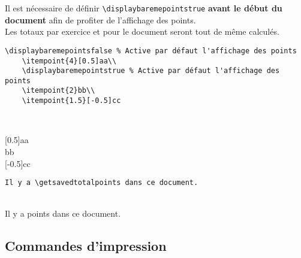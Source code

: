 Il est nécessaire de définir \texttt{\backslash displaybaremepointstrue} \textbf{avant le début du document} afin de profiter de l'affichage des points.\\
Les totaux par exercice et pour le document seront tout de même calculés.
\begin{tcolorbox}[colback=yellow!10!white, title=Exemple d'utilisation pour \texttt{competence}]
\begin{minipage}{0.65\textwidth}
\begin{lstlisting}[breaklines]
    \displaybaremepointsfalse % Active par défaut l'affichage des points
	\itempoint{4}[0.5]aa\\
	\displaybaremepointstrue % Active par défaut l'affichage des points
	\itempoint{2}bb\\
	\itempoint{1.5}[-0.5]cc
\end{lstlisting}
\end{minipage}\\

\end{tcolorbox}
\displaybaremepointsfalse %
	[0.5]aa\\
	\displaybaremepointstrue %
bb\\
[-0.5]cc

\begin{tcolorbox}[colback=yellow!10!white, title=Exemple d'utilisation pour \texttt{competence}]
\begin{minipage}{0.65\textwidth}
\begin{lstlisting}[breaklines]
	Il y a \getsavedtotalpoints dans ce document.
\end{lstlisting}
\end{minipage}\\
	Il y a \getsavedtotalpoints points dans ce document.
\end{tcolorbox}

\subsection{Commandes d'impression}


